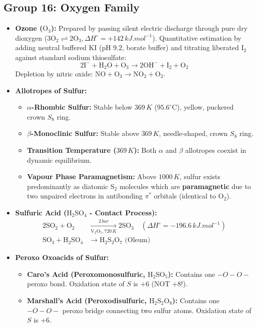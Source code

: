 \documentclass[10pt,twoside,openright]{book}
\begin{document}
\subsection{Group 16: Oxygen Family}
\begin{itemize}
  \item \textbf{Ozone ($\mathrm{O_3}$):} Prepared by passing silent electric discharge through pure dry dioxygen ($3\mathrm{O_2 \rightleftharpoons 2O_3}, \Delta H^\circ = +142\,\si{kJ.mol^{-1}}$). Quantitative estimation by adding neutral buffered $\mathrm{KI}$ ($\text{pH } 9.2$, borate buffer) and titrating liberated $\mathrm{I_2}$ against standard sodium thiosulfate:
  \begin{equation}
    2\mathrm{I^-} + \mathrm{H_2O} + \mathrm{O_3} \longrightarrow 2\mathrm{OH^-} + \mathrm{I_2} + \mathrm{O_2}
  \end{equation}
  Depletion by nitric oxide: $\mathrm{NO + O_3 \to NO_2 + O_2}$.
  \item \textbf{Allotropes of Sulfur:}
  \begin{itemize}
    \item \textbf{$\alpha$-Rhombic Sulfur:} Stable below $369\,\si{K}$ ($95.6^\circ\text{C}$), yellow, puckered crown $S_8$ ring.
    \item \textbf{$\beta$-Monoclinic Sulfur:} Stable above $369\,\si{K}$, needle-shaped, crown $S_8$ ring.
    \item \textbf{Transition Temperature ($369\,\si{K}$):} Both $\alpha$ and $\beta$ allotropes coexist in dynamic equilibrium.
    \item \textbf{Vapour Phase Paramagnetism:} Above $1000\,\si{K}$, sulfur exists predominantly as diatomic $\mathbf{\mathrm{S_2}}$ molecules which are \textbf{paramagnetic} due to two unpaired electrons in antibonding $\pi^*$ orbitals (identical to $\mathrm{O_2}$).
  \end{itemize}
  \item \textbf{Sulfuric Acid ($\mathrm{H_2SO_4}$ - Contact Process):}
  \begin{align}
    2\mathrm{SO_2} + \mathrm{O_2} &\xrightarrow[\mathrm{V_2O_5}, 720\,\si{K}]{2\,\si{bar}} 2\mathrm{SO_3} \quad (\Delta H^\circ = -196.6\,\si{kJ.mol^{-1}}) \\
    \mathrm{SO_3} + \mathrm{H_2SO_4} &\longrightarrow \mathrm{H_2S_2O_7}\text{ (Oleum)}
  \end{align}
  \item \textbf{Peroxo Oxoacids of Sulfur:}
  \begin{itemize}
    \item \textbf{Caro's Acid (Peroxomonosulfuric, $\mathrm{H_2SO_5}$):} Contains one $-O-O-$ peroxo bond. Oxidation state of $S$ is \textbf{$+6$} (NOT $+8$!).
    \item \textbf{Marshall's Acid (Peroxodisulfuric, $\mathrm{H_2S_2O_8}$):} Contains one $-O-O-$ peroxo bridge connecting two sulfur atoms. Oxidation state of $S$ is \textbf{$+6$}.
  \end{itemize}
\end{itemize}
\end{document}
